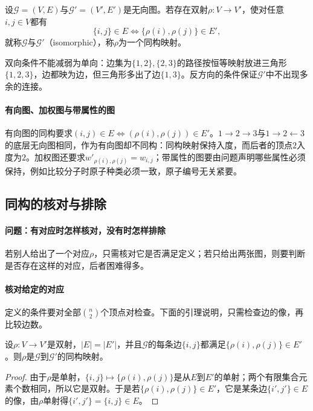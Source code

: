 \begin{definition}[图同构]
\label{def:graph-conn-isomorphism}
设$\mathcal G=(V,E)$与$\mathcal G'=(V',E')$是无向图。若存在双射$\rho:V\to V'$，使对任意$i,j\in V$都有
\[
\{i,j\}\in E\iff\{\rho(i),\rho(j)\}\in E',
\]
就称$\mathcal G$与$\mathcal G'$（isomorphic），称$\rho$为一个同构映射。
\end{definition}

双向条件不能减弱为单向：边集为$\{1,2\},\{2,3\}$的路径按恒等映射放进三角形$\{1,2,3\}$，边都映为边，但三角形多出了边$\{1,3\}$。反方向的条件保证$\mathcal G'$中不出现多余的连接。

\paragraph{有向图、加权图与带属性的图}
有向图的同构要求$(i,j)\in E\iff(\rho(i),\rho(j))\in E'$。$1\to2\to3$与$1\to2\leftarrow3$的底层无向图相同，作为有向图却不同构：同构映射保持入度，而后者的顶点$2$入度为$2$。加权图还要求$w'_{\rho(i),\rho(j)}=w_{i,j}$；带属性的图要由问题声明哪些属性必须保持，例如比较分子时原子种类必须一致，原子编号无关紧要。

\subsection{同构的核对与排除}
\label{sec:graph-conn-isomorphism-checking}

\paragraph{问题：有对应时怎样核对，没有时怎样排除}
若别人给出了一个对应$\rho$，只需核对它是否满足定义；若只给出两张图，则要判断是否存在这样的对应，后者困难得多。

\paragraph{核对给定的对应}
定义的条件要对全部$\binom n2$个顶点对检查。下面的引理说明，只需检查边的像，再比较边数。

\begin{lemma}[同构映射的核对]
\label{lem:graph-conn-isomorphism-check}
设$\rho:V\to V'$是双射，$|E|=|E'|$，并且$\mathcal G$的每条边$\{i,j\}$都满足$\{\rho(i),\rho(j)\}\in E'$。则$\rho$是$\mathcal G$到$\mathcal G'$的同构映射。
\end{lemma}

\begin{proof}
由于$\rho$是单射，$\{i,j\}\mapsto\{\rho(i),\rho(j)\}$是从$E$到$E'$的单射；两个有限集合元素个数相同，所以它是双射。于是若$\{\rho(i),\rho(j)\}\in E'$，它是某条边$\{i',j'\}\in E$的像，由$\rho$单射得$\{i',j'\}=\{i,j\}\in E$。
\end{proof}

